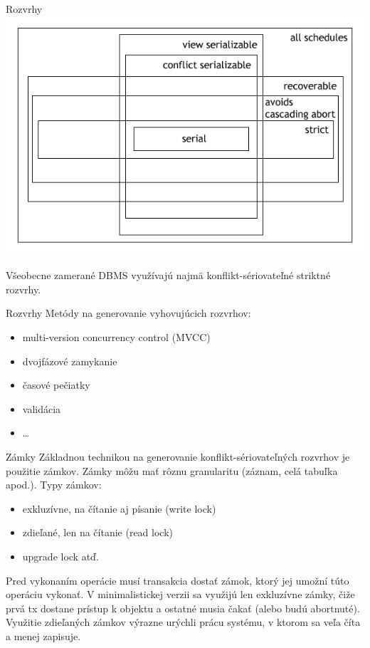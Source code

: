 \documentclass[12pt]{beamer}
\begin{document}
\begin{frame}[fragile]{Rozvrhy}
\includegraphics[scale=2]{rozvrhy.png}

Všeobecne zamerané DBMS využívajú najmä konflikt-sériovateľné striktné rozvrhy.
\end{frame}

\begin{frame}[fragile]{Rozvrhy}
Metódy na generovanie vyhovujúcich rozvrhov:
\begin{itemize}
\item multi-version concurrency control (MVCC)
\item dvojfázové zamykanie
\item časové pečiatky
\item validácia
\item \dots
\end{itemize}
\end{frame}

\begin{frame}[fragile]{Zámky}
Základnou technikou na generovanie konflikt-sériovateľných rozvrhov je použitie zámkov.
\alert{Zámky} môžu mať rôznu granularitu (záznam, celá tabuľka apod.). Typy zámkov:
\begin{itemize}
\item exkluzívne, na čítanie aj písanie (write lock)
\item zdieľané, len na čítanie (read lock)
\item upgrade lock atď.
\end{itemize}
Pred vykonaním operácie musí transakcia dostať zámok, ktorý jej umožní túto operáciu vykonať.
V minimalistickej verzii sa využijú len exkluzívne zámky, čiže prvá tx dostane prístup k objektu
a ostatné musia čakať (alebo budú abortnuté). Využitie zdieľaných zámkov výrazne urýchli prácu systému,
v ktorom sa veľa číta a menej zapisuje.
\end{frame}
\end{document}
